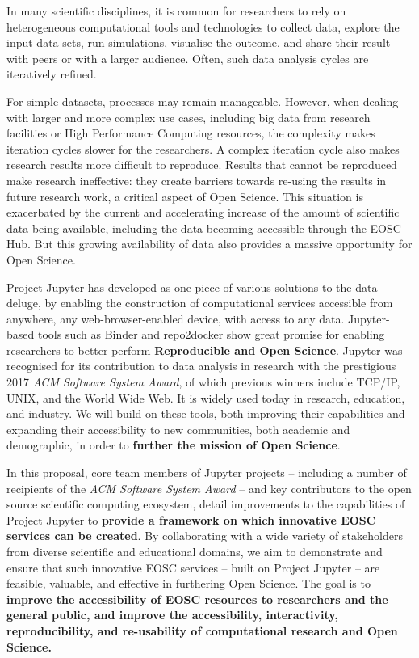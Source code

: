 
In many scientific disciplines, it is common for researchers to rely on
heterogeneous computational tools and technologies to collect data, explore the
input data sets, run simulations, visualise the outcome, and share their result
with peers or with a larger audience. Often, such data analysis cycles are
iteratively refined.

For simple datasets, processes may remain manageable. However, when dealing with
larger and more complex use cases, including big data from research facilities
or High Performance Computing resources, the complexity makes iteration cycles
slower for the researchers. A complex iteration cycle also makes research
results more difficult to reproduce. Results that cannot be reproduced make
research ineffective: they create barriers towards re-using the results in
future research work, a critical aspect of Open Science. This situation is
exacerbated by the current and accelerating increase of the amount of scientific
data being available, including the data becoming accessible through the
EOSC-Hub. But this growing availability of data also provides a massive
opportunity for Open Science.

Project Jupyter has developed as one piece of various solutions to the data
deluge, by enabling the construction of computational services accessible from
anywhere, any web-browser-enabled device, with access to any data. Jupyter-based
tools such as \href{http://mybinder.org}{Binder} and repo2docker show great
promise for enabling researchers to better perform \textbf{Reproducible and Open
  Science}. Jupyter was recognised for its contribution to data analysis in
research with the prestigious 2017 \emph{ACM Software System Award}, of which
previous winners include TCP/IP, UNIX, and the World Wide Web. It is widely used
today in research, education, and industry. We will build on these tools, both
improving their capabilities and expanding their accessibility to new
communities, both academic and demographic, in order to \textbf{further the
  mission of Open Science}.

In this proposal, core team members of Jupyter projects -- including a number of
recipients of the \emph{ACM Software System Award} -- and key contributors to
the open source scientific computing ecosystem, detail improvements to the
capabilities of Project Jupyter to \textbf{provide a framework on which
  innovative EOSC services can be created}. By collaborating with a wide variety
of stakeholders from diverse scientific and educational domains, we aim to
demonstrate and ensure that such innovative EOSC services -- built on Project
Jupyter -- are feasible, valuable, and effective in furthering Open Science. The
goal is to \textbf{improve the accessibility of EOSC resources to researchers
  and the general public, and improve the accessibility, interactivity,
  reproducibility, and re-usability of computational research and Open Science.}


